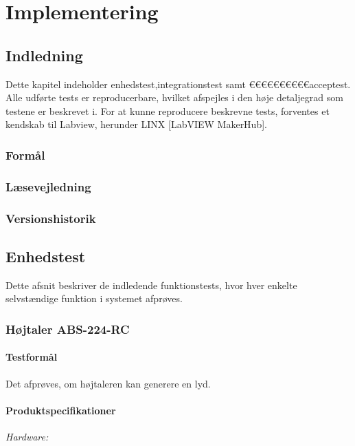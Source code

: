 \chapter{Implementering}

\section{Indledning}
	Dette kapitel indeholder enhedstest,integrationstest samt €€€€€€€€€€acceptest. Alle udførte tests er reproducerbare, hvilket afspejles i den høje detaljegrad som testene er beskrevet i. For at kunne reproducere beskrevne tests, forventes et kendskab til Labview, herunder LINX [LabVIEW MakerHub]. 
	
	    	  
		\subsection{Formål}
	
		\subsection{Læsevejledning}	
	
		
		\subsection{Versionshistorik}

 
\section{Enhedstest}
	Dette afsnit beskriver de indledende funktionstests, hvor hver enkelte selvstændige funktion i systemet afprøves. 
	
	\subsection{Højtaler ABS-224-RC}
	\label{etha}
		\subsubsection{Testformål}
		Det afprøves, om højtaleren kan generere en lyd.
		\subsubsection{Produktspecifikationer}
	
	
		\textit{Hardware:}\\
		\\
		\\
		\pins\\
		\arduino\\
		\PC\\
		\usbkabel\\
	
